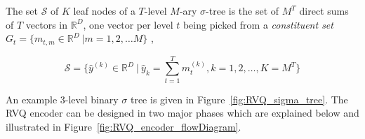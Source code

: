 \begin{Body}
The set $\mathcal{S}$ of $K$ leaf nodes of a $T$-level $M$-ary $\sigma$-tree is the set of $M^T$ direct sums of $T$ vectors in $\mathbb{R}^D$, one vector per level $t$ being picked from a \emph{constituent set} $G_t = \{m_{t,m} \in \mathbb{R}^D \ | m=1, 2, \ldots M\}$ \cite{2002_JNL_SigmaTrees_Barnes},

\begin{equation}
\mathcal{S} = \{\hat{y}^{(k)} \in \mathbb{R}^D \ | \ \hat{y}_k = \sum\limits_{t=1}^T m_t^{(k)}, k=1, 2, \ldots, K=M^T\}
\end{equation}

An example 3-level binary $\sigma$ tree is given in Figure~\ref{fig:RVQ_sigma_tree}.  The RVQ encoder can be designed in two major phases which are explained below and illustrated in Figure~\ref{fig:RVQ_encoder_flowDiagram}. 
 


 


\end{Body}
